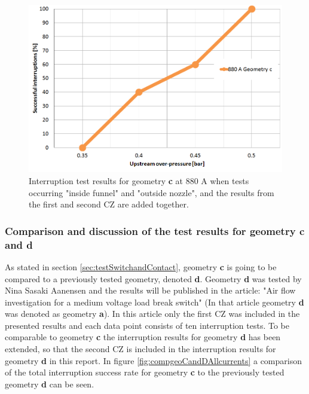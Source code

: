 \documentclass[10pt,b5paper,twoside]{article}
\begin{document}

\begin{figure}[H]
\centering
\includegraphics[scale=0.45]{Bilder/Results/geoC880amp.PNG}
\caption{Interruption test results for geometry \textbf{c} at 880 A when tests occurring "inside funnel" and "outside nozzle", and the results from the first and second CZ are added together.} \label{fig:results880AgeoC}
\end{figure}

\subsubsection{Comparison and discussion of the test results for geometry \textbf{c} and \textbf{d}}

As stated in section \ref{sec:testSwitchandContact}, geometry \textbf{c} is going to be compared to a previously tested geometry, denoted \textbf{d}. Geometry \textbf{d} was tested by Nina Sasaki Aanensen and the results will be published in the article: "Air flow investigation for a medium voltage load break switch" \cite{bib:AFIMVLBA} (In that article geometry \textbf{d} was denoted as geometry \textbf{a}). In this article only the first CZ was included in the presented results and each data point consists of ten interruption tests. To be comparable to geometry \textbf{c} the interruption results for geometry \textbf{d} has been extended, so that the second CZ is included in the interruption results for geometry \textbf{d} in this report. In figure \ref{fig:compgeoCandDAllcurrents} a comparison of the total interruption success rate for geometry \textbf{c} to the previously tested geometry \textbf{d} can be seen.
\end{document}
